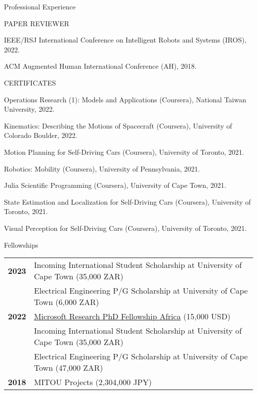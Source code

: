 \documentclass{resume} %
\begin{document}
\begin{rSection}{Professional Experience} \itemsep 4pt
    \begin{rSubsection}{PAPER REVIEWER}{}{}{}{}
        \item IEEE/RSJ International Conference on Intelligent Robots and Systems (IROS), 2022.
        \item ACM Augmented Human International Conference (AH), 2018.
    \end{rSubsection}
    \begin{rSubsection}{CERTIFICATES}{}{}{}{}
        \item Operations Research (1): Models and Applications (Coursera), National Taiwan University, 2022.
        \item Kinematics: Describing the Motions of Spacecraft (Coursera), University of Colorado Boulder, 2022.
        \item Motion Planning for Self-Driving Cars (Coursera), University of Toronto, 2021.
        \item Robotics: Mobility (Coursera), University of Pennsylvania, 2021.
        \item Julia Scientific Programming (Coursera), University of Cape Town, 2021.
        \item State Estimation and Localization for Self-Driving Cars (Coursera), University of Toronto, 2021.
        \item Visual Perception for Self-Driving Cars (Coursera), University of Toronto, 2021.
    \end{rSubsection}
\end{rSection}

\begin{rSection}{Fellowships}
    \begin{tabular}{ @{} >{\bfseries}l @{\hspace{4ex}} l }
        2023    &   Incoming International Student Scholarship at University of Cape Town (35,000 ZAR) \\
                &   Electrical Engineering P/G Scholarship at University of Cape Town (6,000 ZAR) \\
        2022    &   \href{https://www.microsoft.com/en-us/research/academic-program/phd-fellowship/africa/}{Microsoft Research PhD Fellowship Africa} (15,000 USD) \\
                &   Incoming International Student Scholarship at University of Cape Town (35,000 ZAR) \\
                &   Electrical Engineering P/G Scholarship at University of Cape Town (47,000 ZAR) \\
        2018    &   MITOU Projects (2,304,000 JPY) \\
\end{tabular}
\end{rSection}
\end{document}
